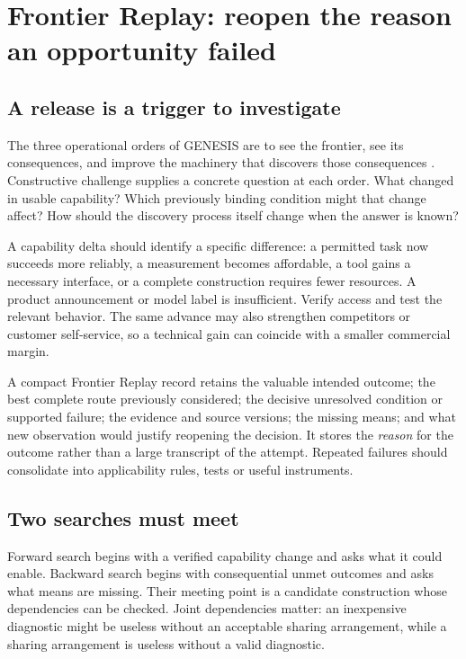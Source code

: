 \section{Frontier Replay: reopen the reason an opportunity failed}
\label{sec:replay}
\subsection{A release is a trigger to investigate}
The three operational orders of GENESIS are to see the frontier, see its consequences, and improve the machinery that discovers those consequences \citep[\S3]{boucher_genesis}. Constructive challenge supplies a concrete question at each order. What changed in usable capability? Which previously binding condition might that change affect? How should the discovery process itself change when the answer is known?

A capability delta should identify a specific difference: a permitted task now succeeds more reliably, a measurement becomes affordable, a tool gains a necessary interface, or a complete construction requires fewer resources. A product announcement or model label is insufficient. Verify access and test the relevant behavior. The same advance may also strengthen competitors or customer self-service, so a technical gain can coincide with a smaller commercial margin.

A compact Frontier Replay record retains the valuable intended outcome; the best complete route previously considered; the decisive unresolved condition or supported failure; the evidence and source versions; the missing means; and what new observation would justify reopening the decision. It stores the \emph{reason} for the outcome rather than a large transcript of the attempt. Repeated failures should consolidate into applicability rules, tests or useful instruments.

\subsection{Two searches must meet}
Forward search begins with a verified capability change and asks what it could enable. Backward search begins with consequential unmet outcomes and asks what means are missing. Their meeting point is a candidate construction whose dependencies can be checked. Joint dependencies matter: an inexpensive diagnostic might be useless without an acceptable sharing arrangement, while a sharing arrangement is useless without a valid diagnostic.

